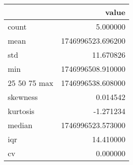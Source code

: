 \begin{tabular}{lr}
\toprule
 & value \\
\midrule
count & 5.000000 \\
mean & 1746996523.696200 \\
std & 11.670826 \\
min & 1746996508.910000 \\
25%
50%
75%
max & 1746996538.608000 \\
skewness & 0.014542 \\
kurtosis & -1.271234 \\
median & 1746996523.573000 \\
iqr & 14.410000 \\
cv & 0.000000 \\
\bottomrule
\end{tabular}
